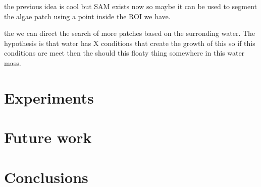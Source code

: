 \documentclass[notitlepage]{report}
\begin{document}
    
    the previous idea is cool but SAM exists now so maybe it can be used to segment the algae patch
    using a point inside the ROI we have.
    
    the we can direct the search of more patches based on the surronding water. 
    The hypothesis is that water has X conditions that create the growth of this so if this conditions
    are meet then the should this floaty thing somewhere in this water mass.


    \section*{Experiments}
    
    \section*{Future work}


    \section*{Conclusions}
\end{document}
